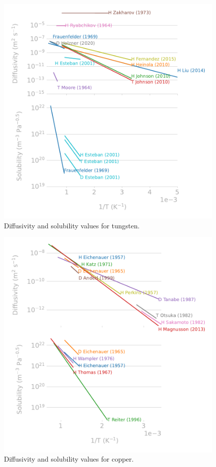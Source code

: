 \begin{figure}
    \centering
    \includegraphics[width=0.75\linewidth]{Figures/Chapter1/tungsten_properties_review.pdf}
    \caption{Diffusivity and solubility values for tungsten.}
\end{figure}

\begin{figure}
    \centering
    \includegraphics[width=0.75\linewidth]{Figures/Chapter1/copper_properties_review.pdf}
    \caption{Diffusivity and solubility values for copper.}
\end{figure}

